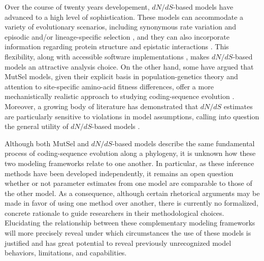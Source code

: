 \documentclass[11pt]{article}
\begin{document}
Over the course of twenty years developement, $dN/dS$-based models have advanced to a high level of sophistication. These models can accommodate a variety of evolutionary scenarios, including synonymous rate variation \citep{MuseGaut1994,KosakovskyPondMuse2005,Rubinsteinetal2011} and episodic \citep{KosakovskyPondetal2011,MEME} and/or lineage-specific selection \citep{YangNielsen2002,Zhangetal2005,KosakovskyPondFrost2005a}, and they can also incorporate information regarding protein structure and epistatic interactions \citep{Robinsonetal2003,Thorneetal2007,Rodrigueetal2009,Scherreretal2012,MeyerWilke2013}. This flexibility, along with accessible software implementations \citep{KosakovskyPondetal2005,Yang2007,Delport2010}, makes $dN/dS$-based models an attractive analysis choice. On the other hand, some have argued that MutSel models, given their explicit basis in population-genetics theory and attention to site-specific amino-acid fitness differences, offer a more mechanistically realistic approach to studying coding-sequence evolution \citep{HalpernBruno1998,Rodrigueetal2010,Tamurietal2012,Thorne2012}. Moreover, a growing body of literature has demonstrated that $dN/dS$ estimates are particularly sensitive to violations in model assumptions, calling into question the general utility of $dN/dS$-based models \citep{Rochaetal2006,KryazhimskiyPlotkin2008,Ratnakumaretal2010,Mugaletal2014}.

Although both MutSel and $dN/dS$-based models describe the same fundamental process of coding-sequence evolution along a phylogeny, it is unknown how these two modeling frameworks relate to one another. In particular, as these inference methods have been developed independently, it remains an open question whether or not parameter estimates from one model are comparable to those of the other model. As a consequence, although certain rhetorical arguments may be made in favor of using one method over another, there is currently no formalized, concrete rationale to guide researchers in their methodological choices. Elucidating the relationship between these complementary modeling frameworks will more precisely reveal under which circumstances the use of these models is justified and has great potential to reveal previously unrecognized model behaviors, limitations, and capabilities.
		
\end{document}
